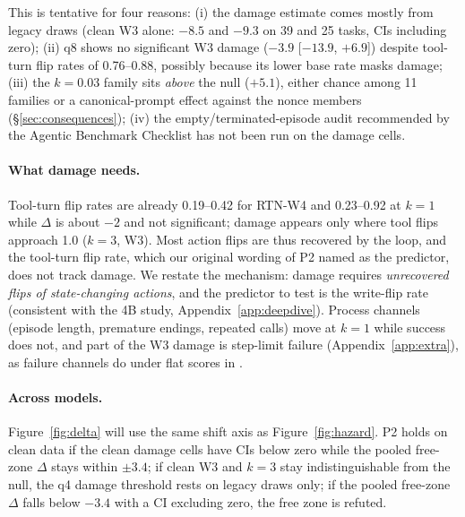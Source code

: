 This is tentative for four reasons: (i) the damage estimate comes mostly from legacy draws (clean W3 alone: $-8.5$ and $-9.3$\pp{} on 39 and 25 tasks, CIs including zero); (ii) q8 shows no significant W3 damage ($-3.9$\pp{} [$-13.9$, $+6.9$]) despite tool-turn flip rates of 0.76--0.88, possibly because its lower base rate masks damage; (iii) the $k{=}0.03$ family sits \emph{above} the null ($+5.1$\pp{}), either chance among 11 families or a canonical-prompt effect against the nonce members (\S\ref{sec:consequences}); (iv) the empty/terminated-episode audit recommended by the Agentic Benchmark Checklist \citep{zhu2025abc} has not been run on the damage cells.

\paragraph{What damage needs.} Tool-turn flip rates are already 0.19--0.42 for RTN-W4 and 0.23--0.92 at $k{=}1$ while $\Delta$ is about $-2$\pp{} and not significant; damage appears only where tool flips approach 1.0 ($k{=}3$, W3). Most action flips are thus recovered by the loop, and the tool-turn flip rate, which our original wording of P2 named as the predictor, does not track damage. We restate the mechanism: damage requires \emph{unrecovered flips of state-changing actions}, and the predictor to test is the write-flip rate (consistent with the 4B study, Appendix~\ref{app:deepdive}).  Process channels (episode length, premature endings, repeated calls) move at $k{=}1$ while success does not, and part of the W3 damage is step-limit failure (Appendix~\ref{app:extra}), as failure channels do under flat scores in \citet{jang2026flat}.

\paragraph{Across models.} Figure~\ref{fig:delta} will use the same shift axis as Figure~\ref{fig:hazard}.  P2 holds on clean data if the clean damage cells have CIs below zero while the pooled free-zone $\Delta$ stays within $\pm 3.4$\pp{}; if clean W3 and $k{=}3$ stay indistinguishable from the null, the q4 damage threshold rests on legacy draws only; if the pooled free-zone $\Delta$ falls below $-3.4$\pp{} with a CI excluding zero, the free zone is refuted.

